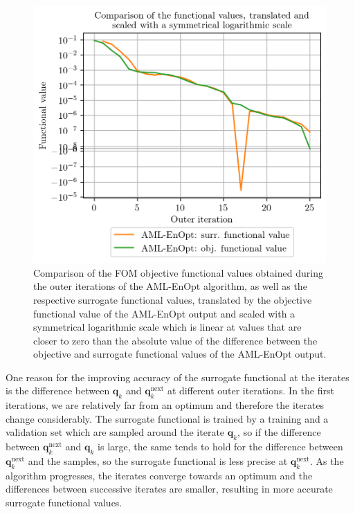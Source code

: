 \begin{figure}
\centering
\includegraphics{Plots/reducedFunctionalValueCompSymlog.png}
\caption{\label{AMLEnOptFuncValCompSymlog}Comparison of the FOM objective functional values obtained during the outer iterations of the AML-EnOpt algorithm, as well as the respective surrogate functional values, translated by the objective functional value of the AML-EnOpt output and scaled with a symmetrical logarithmic scale which is linear at values that are closer to zero than the absolute value of the difference between the objective and surrogate functional values of the AML-EnOpt output.}
\end{figure}

One reason for the improving accuracy of the surrogate functional at the iterates is the difference between $\mathbf{q}_k$ and $\mathbf{q}^\mathrm{next}_k$ at different outer iterations. In the first iterations, we are relatively far from an optimum and therefore the iterates change considerably. The surrogate functional is trained by a training and a validation set which are sampled around the iterate $\mathbf{q}_k$, so  if the difference between $\mathbf{q}^\mathrm{next}_k$ and $\mathbf{q}_k$ is large, the same tends to hold for the difference between $\mathbf{q}^\mathrm{next}_k$ and the samples, so the surrogate functional is less precise at $\mathbf{q}^\mathrm{next}_k$. As the algorithm progresses, the iterates converge towards an optimum and the differences between successive iterates are smaller, resulting in more accurate surrogate functional values.

